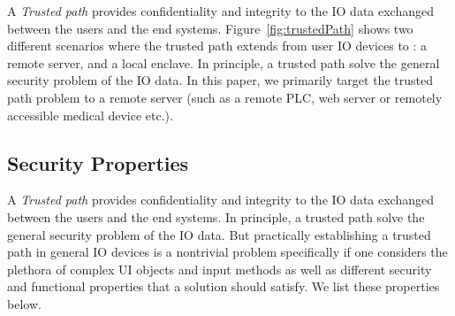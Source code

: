 A \emph{Trusted path} provides confidentiality and integrity to the IO data exchanged between the users and the end systems. Figure~\ref{fig:trustedPath} shows two different scenarios where the trusted path extends from user IO devices to : \one a remote server, and \two a local enclave. In principle, a trusted path solve the general security problem of the IO data. 
In this paper, we primarily target the trusted path problem to a remote server (such as a remote PLC, web server or remotely accessible medical device etc.).

\iffalse
\subsection{Security Properties}

A \emph{Trusted path} provides confidentiality and integrity to the IO data exchanged between the users and the end systems. In principle, a trusted path solve the general security problem of the IO data. But practically establishing a trusted path in general IO devices is a nontrivial problem specifically if one considers the plethora of complex UI objects and input methods as well as different security and functional properties that a solution should satisfy. We list these properties below. 


